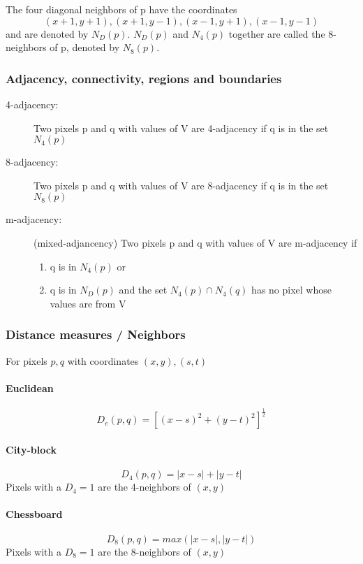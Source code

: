 The four diagonal neighbors of p have the coordinates
\[
	(x+1, y+1), (x+1, y-1), (x-1, y+1), (x-1, y-1)
\]
and are denoted by $N_D(p)$. $N_D(p)$ and $N_4(p)$ together are called the 8-neighbors of p, denoted by $N_8(p)$.


\subsubsection{Adjacency, connectivity, regions and boundaries}
\begin{description}
  \item[4-adjacency:] Two pixels p and q with values of V are 4-adjacency if q is in the set $N_4(p)$
  \item[8-adjacency:] Two pixels p and q with values of V are 8-adjacency if q is in the set $N_8(p)$
  \item[m-adjacency:] (mixed-adjancency) Two pixels p and q with values of V are m-adjacency if
  	\begin{enumerate}
  		\item q is in $N_4(p)$ or
  		\item q is in $N_D(p)$ and the set $N_4(p) \cap N_4(q)$ has no pixel whose values are from V 
	\end{enumerate}
\end{description}

\subsubsection{Distance measures / Neighbors}
For pixels $p,q$  with coordinates $(x,y), (s,t)$
\paragraph{Euclidean}
\begin{equation}
D_e(p,q) = [(x-s)^2 + (y-t)^2]^{\frac{1}{2}}
\end{equation}
\paragraph{City-block}
\begin{equation}
D_4(p,q) = |x-s| + |y-t|
\end{equation}
Pixels with a $D_4 = 1$ are the 4-neighbors of $(x,y)$
\paragraph{Chessboard}
\begin{equation}
D_8(p,q) = max(|x-s|, |y-t|)
\end{equation}
Pixels with a $D_8 = 1$ are the 8-neighbors of $(x,y)$

